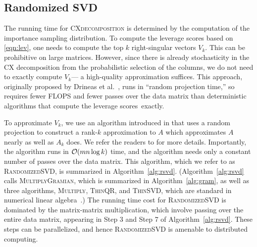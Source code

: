 \subsection{Randomized SVD}

The running time for \textsc{CXdecomposition} is determined by the
computation of the importance sampling distribution.  To compute the leverage
scores based on \eqref{eqn:lev}, one needs to compute the top
$k$ right-singular vectors $V_k$. This can be prohibitive on
large matrices. However, since there is already stochasticity in the 
CX decomposition from the probabilistic selection of the columns, we 
do not need to exactly compute $V_k$--- a high-quality approximation suffices. 
This approach, originally proposed by Drineas et al.~\cite{DMMW12_JMLR}, runs in
``random projection time,'' so requires fewer FLOPS and fewer passes over
the data matrix than deterministic algorithms that compute the
leverage scores~exactly.


To approximate $V_k$, we use an algorithm introduced in \cite{MRT06,MRT11}
that uses a random projection to construct a rank-$k$ approximation to $A$
which approximates $A$ nearly as well as $A_k$ does.  We refer the readers to
\cite{HMT09_SIREV,Mah-mat-rev_BOOK} for more details.  Importantly, the
algorithm runs in $\operatorname{\mathcal{O}}(mn \log k)$ time, and the algorithm needs only a
constant number of passes over the data matrix.  This algorithm, which
we refer to as \textsc{RandomizedSVD}, is summarized in
Algorithm~\ref{alg:rsvd}.  (Algorithm~\ref{alg:rsvd} calls
\textsc{MultiplyGramian}, which is summarized in Algorithm~\ref{alg:gram}, as
well as three algorithms, \textsc{Multiply}, \textsc{ThinQR}, and
\textsc{ThinSVD}, which are standard in numerical linear algebra~\cite{GVL96}.)
The running time cost for \textsc{RandomizedSVD} is dominated by the
matrix-matrix multiplication, which involve passing over the entire data
matrix, appearing in Step 3 and Step 7 of Algorithm~\ref{alg:rsvd}.  
These steps can be parallelized, and hence \textsc{RandomizedSVD} is 
amenable to distributed computing.

